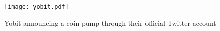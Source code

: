 \begin{figure}[ht]
    \centering
    \texttt{[image: yobit.pdf]}
    \caption{Yobit announcing a coin-pump through their official Twitter account}
    \label{fig:yobit}
\end{figure}



